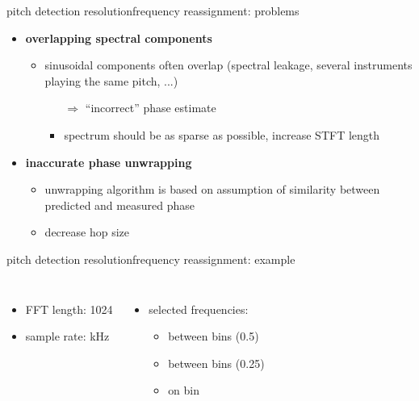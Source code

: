         \begin{frame}{pitch detection resolution}{frequency reassignment: problems}
                \begin{itemize}
                    \item   \textbf{overlapping spectral components}
                        \begin{itemize}
                            \item   sinusoidal components often overlap (spectral leakage, several instruments playing the same pitch, ...)
                                \begin{itemize}
                                    \item[$\Rightarrow$] ``incorrect'' phase estimate
                                    \item<1-> spectrum should be as sparse as possible, increase STFT length
                                \end{itemize}
                        \end{itemize}
                    \bigskip
                    \item<2->   \textbf{inaccurate phase unwrapping} 
                        \begin{itemize}
                            \item   unwrapping algorithm is based on assumption of similarity between predicted and measured phase
                            \item<2-> decrease hop size
                        \end{itemize}
                \end{itemize}
        \end{frame}
        \begin{frame}{pitch detection resolution}{frequency reassignment: example}
            \begin{columns}
            \begin{itemize}
                \item   FFT length: 1024
                \item   sample rate: \unit[48]{kHz}
            \end{itemize}
            \begin{itemize}
                \item   selected frequencies: 
                    \begin{itemize}
                        \item   between bins (0.5)
                        \item   between bins (0.25)
                        \item   on bin
                    \end{itemize}
            \end{itemize}
            \end{columns}
        \end{frame}

